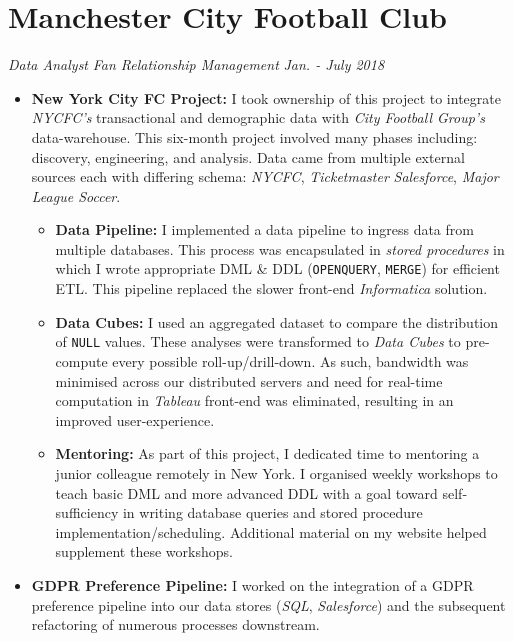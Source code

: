 \documentclass[letterpaper,11pt]{article}
\begin{document}
\section{Manchester City Football Club}
\textit{Data Analyst}
\hfill
\textit{Fan Relationship Management}
\hfill
\textit{Jan. - July 2018}
\begin{itemize}
	\item
	      {
	      \textbf{New York City FC Project:}
	      I took ownership of this project to integrate \textit{NYCFC's} transactional and demographic data with \textit{City Football Group's} data-warehouse. This six-month project involved many phases including: discovery, engineering, and analysis. Data came from multiple external sources each with differing schema: \textit{NYCFC}, \textit{Ticketmaster} \textit{Salesforce}, \textit{Major League Soccer}.
	      \begin{itemize}
		      \item
		            {
		            \textbf{Data Pipeline:}
		            I implemented a data pipeline to ingress data from multiple databases.
		            This process was encapsulated in \textit{stored procedures} in which I wrote appropriate DML \& DDL (\texttt{OPENQUERY}, \texttt{MERGE}) for efficient ETL.
		            This pipeline replaced the slower front-end  \textit{Informatica} solution.
		            }
		      \item
		            {
		            \textbf{Data Cubes:}
		            I used an aggregated dataset to compare the distribution of \texttt{NULL} values. These analyses were transformed to \textit{Data Cubes} to pre-compute every possible roll-up/drill-down. As such, bandwidth was minimised across our distributed servers and need for real-time computation in \textit{Tableau} front-end was eliminated, resulting in an improved user-experience.
		            }
		      \item
		            {
		            \textbf{Mentoring:}
		            As part of this project, I dedicated time to mentoring a junior colleague remotely in New York. I organised weekly workshops to teach basic DML and more advanced DDL with a goal toward self-sufficiency in writing database queries and stored procedure implementation/scheduling. Additional material on my website helped supplement these workshops.
		            }
	      \end{itemize}
	      }
	\item
	      {
	      \textbf{GDPR Preference Pipeline:}
	      I worked on the integration of a GDPR preference pipeline into our data stores (\textit{SQL}, \textit{Salesforce}) and the subsequent refactoring of numerous processes downstream.
}
\end{itemize}
\end{document}
